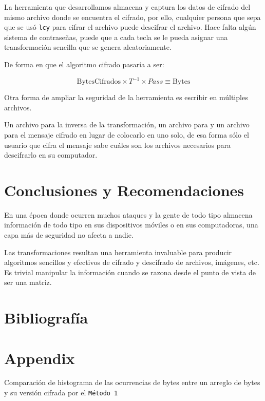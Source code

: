 \documentclass[a4paper]{article}
\begin{document}
La herramienta que desarrollamos almacena y captura los datos de cifrado del
mismo archivo donde se encuentra el cifrado, por ello, cualquier persona que
sepa que se usó \texttt{lcy} para cifrar el archivo puede descifrar el archivo.
Hace falta algún sistema de contraseñas, puede que a cada tecla se le pueda
asignar una transformación sencilla que se genera aleatoriamente. 

De forma en que el algoritmo cifrado pasaría a ser:

\[
\text{BytesCifrados} \times T^{-1} \times Pass \equiv \text{Bytes}
\]

Otra forma de ampliar la seguridad de la herramienta es escribir en múltiples
archivos. 

Un archivo para la inversa de la transformación, un archivo para
 y un archivo para el mensaje cifrado en lugar de colocarlo
en uno solo, de esa forma sólo el usuario que cifra el mensaje sabe cuáles son
los archivos necesarios para descifrarlo en su computador.

\newpage
\section{Conclusiones y Recomendaciones}

En una época donde ocurren muchos ataques y la gente de todo tipo almacena
información de todo tipo en sus dispositivos móviles o en sus computadoras, una
capa más de seguridad no afecta a nadie.

Las transformaciones resultan una herramienta invaluable para producir
algoritmos sencillos y efectivos de cifrado y descifrado de archivos, imágenes,
etc. Es trivial manipular la información cuando se razona desde el punto de
vista de ser una matriz.



\newpage
\section{Bibliografía}
\printbibliography[heading=none]

\newpage

\appendix

\section{Appendix}

Comparación de histograma de las ocurrencias de bytes entre un arreglo de bytes
y su versión cifrada por el \texttt{Método 1}
\end{document}
